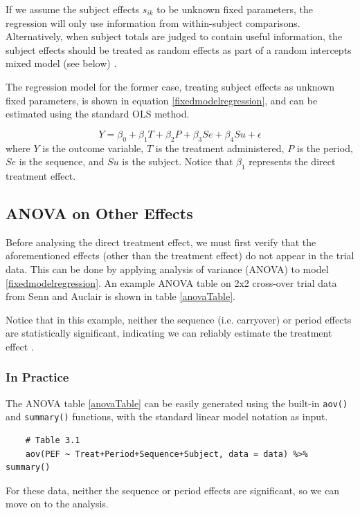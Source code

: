 \documentclass[12pt, TexShade, letterpaper]{report}
\begin{document}
If we assume the subject effects $s_{ik}$ to be unknown fixed parameters, the regression will only use information from within-subject comparisons. Alternatively, when subject totals are judged to contain useful information, the subject effects should be treated as random effects as part of a random intercepts mixed model (see below) \cite{jones2003design}.

The regression model for the former case, treating subject effects as unknown fixed parameters, is shown in equation \ref{fixedmodelregression}, and can be estimated using the standard OLS method.

\begin{equation}
     Y = \beta_0 + \beta_1 T + \beta_2 P + \beta_3 Se + \beta_4 Su + \epsilon
     \label{fixedmodelregression}
\end{equation}
where $Y$ is the outcome variable, $T$ is the treatment administered, $P$ is the period, $Se$ is the sequence, and $Su$ is the subject. Notice that $\beta_1$ represents the direct treatment effect.

\subsection{ANOVA on Other Effects}
Before analysing the direct treatment effect, we must first verify that the aforementioned effects (other than the treatment effect) do not appear in the trial data. This can be done by applying analysis of variance (ANOVA) to model \ref{fixedmodelregression}. An example ANOVA table on 2x2 cross-over trial data from Senn and Auclair \cite{senn1990graphical} is shown in table \ref{anovaTable}.



Notice that in this example, neither the sequence (i.e. carryover) or period effects are statistically significant, indicating we can reliably estimate the treatment effect \cite{lim2021considerations}.

\subsubsection{In Practice}
The ANOVA table \ref{anovaTable} can be easily generated using the built-in \texttt{aov()} and \texttt{summary()} functions, with the standard linear model notation as input.
\begin{verbatim}
    # Table 3.1
    aov(PEF ~ Treat+Period+Sequence+Subject, data = data) %>% summary()
\end{verbatim}
For these data, neither the sequence or period effects are significant, so we can move on to the analysis.
\end{document}
